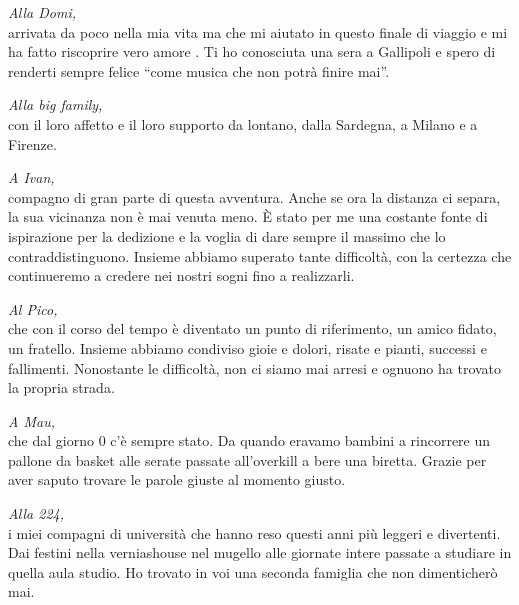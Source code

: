 \documentclass[twoside]{article}
\begin{document}
\vspace{\baselineskip}

\textit{Alla Domi,}\\
arrivata da poco nella mia vita ma che mi aiutato in questo finale di viaggio e mi ha fatto riscoprire vero amore . Ti ho conosciuta una sera a Gallipoli e spero di renderti sempre felice “come musica che non potrà finire mai”.

\vspace{\baselineskip}

\textit{Alla big family,}\\
con il loro affetto e il loro supporto da lontano, dalla Sardegna, a Milano e a Firenze. 

\vspace{\baselineskip}

\textit{A Ivan,}\\
compagno di gran parte di questa avventura. Anche se ora la distanza ci separa, la sua vicinanza non è mai venuta meno. È stato per me una costante fonte di ispirazione per la dedizione e la voglia di dare sempre il massimo che lo contraddistinguono. Insieme abbiamo superato tante difficoltà, con la certezza che continueremo a credere nei nostri sogni fino a realizzarli.
\vspace{\baselineskip}

\textit{Al Pico,}\\
che con il corso del tempo è diventato un punto di riferimento, un amico fidato, un fratello. Insieme abbiamo condiviso gioie e dolori, risate e pianti, successi e fallimenti. Nonostante le difficoltà, non ci siamo mai arresi e ognuono ha trovato la propria strada.

\vspace{\baselineskip}

\textit{A Mau,}\\
che dal giorno 0 c'è sempre stato. Da quando eravamo bambini a rincorrere un pallone da basket alle serate passate all'overkill a bere una biretta. Grazie per aver saputo trovare le parole giuste al momento giusto. 
\vspace{\baselineskip}

\textit{Alla 224,}\\
i miei compagni di università che hanno reso questi anni più leggeri e divertenti. Dai festini nella verniashouse nel mugello alle giornate intere passate a studiare in quella aula studio. Ho trovato in voi una seconda famiglia che non dimenticherò mai. 

\vspace{\baselineskip}
\end{document}
